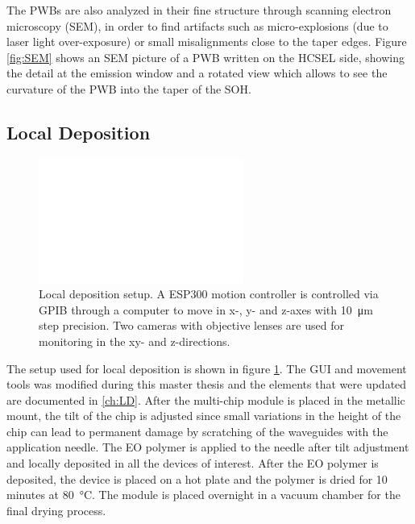 The PWBs are also analyzed in their fine structure through scanning electron microscopy (SEM), in order to find artifacts such as micro-explosions (due to laser light over-exposure) or small misalignments close to the taper edges. Figure \ref{fig:SEM} shows an SEM picture of a PWB written on the HCSEL side, showing the detail at the emission window and a rotated view which allows to see the curvature of the PWB into the taper of the SOH. 

\subsection{Local Deposition}
\label{sec:exp:locdepo}

\begin{figure}[!ht]
\centering
  \includegraphics[width=0.6\textwidth]{visio/LD-SU}
  \caption{Local deposition setup. A ESP300 motion controller is controlled via GPIB through a computer to move in x-, y- and z-axes with \SI{10}{\micro\meter} step precision. Two cameras with objective lenses are used for monitoring in the xy- and z-directions.}
  \label{fig:LD-SU}
\end{figure}

The setup used for local deposition is shown in figure \ref{fig:LD-SU}. The GUI and movement tools was modified during this master thesis and the elements that were updated are documented in \ref{ch:LD}.  After the multi-chip module is placed in the metallic mount, the tilt of the chip is adjusted since small variations in the height of the chip can lead to permanent damage by scratching of the waveguides with the application needle. The EO polymer is applied to the needle after tilt adjustment and locally deposited in all the devices of interest. After the EO polymer is deposited, the device is placed on a hot plate and the polymer is dried for 10 minutes at \SI{80}{\celsius}. The module is placed overnight in a vacuum chamber for the final drying process.

